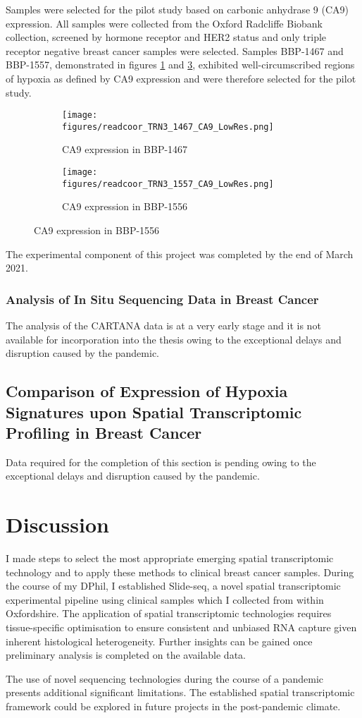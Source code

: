 Samples were selected for the pilot study based on carbonic anhydrase 9 (CA9) expression. All samples were collected from the Oxford Radcliffe Biobank collection, screened by hormone receptor and HER2 status and only triple receptor negative breast cancer samples were selected. Samples BBP-1467 and BBP-1557, demonstrated in figures \ref{fig:readcoor_htrn3_1467_ca9} and \ref{fig:readcoor_htrn3_1556_ca9}, exhibited well-circumscribed regions of hypoxia as defined by CA9 expression and were therefore selected for the pilot study.

\begin{figure}[ht]
	\begin{subfigure}
		\centering
		\texttt{[image: figures/readcoor\_TRN3\_1467\_CA9\_LowRes.png]}  
		\caption{CA9 expression in BBP-1467}
		\label{fig:readcoor_htrn3_1467_ca9}
	\end{subfigure}
	\begin{subfigure}
		\centering
		\texttt{[image: figures/readcoor\_TRN3\_1557\_CA9\_LowRes.png]}  
		\caption{CA9 expression in BBP-1556}
		\label{fig:readcoor_htrn3_1556_ca9}
	\end{subfigure}
\end{figure}

The experimental component of this project was completed by the end of March 2021.

\subsubsection{Analysis of In Situ Sequencing Data in Breast Cancer}
The analysis of the CARTANA data is at a very early stage and it is not available for incorporation into the thesis owing to the exceptional delays and disruption caused by the pandemic. 

\subsection{Comparison of Expression of Hypoxia Signatures upon Spatial Transcriptomic Profiling in Breast Cancer}
Data required for the completion of this section is pending owing to the exceptional delays and disruption caused by the pandemic. 

\section{Discussion}
I made steps to select the most appropriate emerging spatial transcriptomic technology and to apply these methods to clinical breast cancer samples. During the course of my DPhil, I established Slide-seq, a novel spatial transcriptomic experimental pipeline using clinical samples which I collected from within Oxfordshire. The application of spatial transcriptomic technologies requires tissue-specific optimisation to ensure consistent and unbiased RNA capture given inherent histological heterogeneity. Further insights can be gained once preliminary analysis is completed on the available data.

The use of novel sequencing technologies during the course of a pandemic presents additional significant limitations. The established spatial transcriptomic framework could be explored in future projects in the post-pandemic climate.



